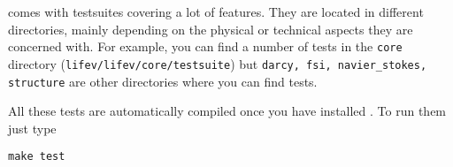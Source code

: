 \noindent \lifev comes with testsuites covering a lot of features. They are located in different directories, mainly depending on the physical or technical aspects they are concerned with. For example, you can find a number of tests in the \verb+core+
directory (\verb+lifev/lifev/core/testsuite+) but \verb+darcy, fsi, navier_stokes, structure+ are other directories where you can find tests.%

All these tests are automatically compiled once you have installed \lifev. To run them just type
\begin{verbatim}
make test
\end{verbatim}



%

%
%
